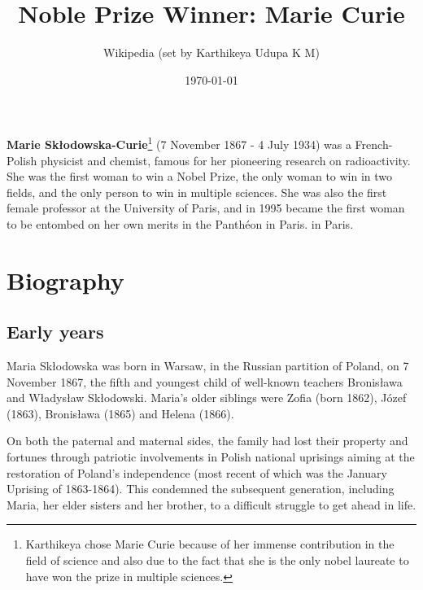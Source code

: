\documentclass[12pt,a4paper]{article}
\title{Noble Prize Winner: Marie Curie}
\author{Wikipedia (set by Karthikeya Udupa K M)}
\date{\today}
\begin{document}
 
\maketitle
\noindent
\textbf{Marie Sk\l{}odowska-Curie}\footnote{Karthikeya chose Marie Curie because of her immense contribution in the field of science and also due to the fact that she is the only nobel laureate to have won the prize in multiple sciences.} (7 November 1867 - 4 July 1934) was a French-Polish physicist and chemist, famous for her pioneering research on radioactivity. She was the first woman to win a Nobel Prize, the only woman to win in two fields, and the only person to win in multiple sciences. She was also the first female professor at the University of Paris, and in 1995 became the first woman to be entombed on her own merits in the Panth\'eon in Paris. in Paris.

\maketitle 

\section{Biography} 

\subsection{Early years}
Maria Sk\l{}odowska was born in Warsaw, in the Russian partition of Poland, on 7 November 1867, the fifth and youngest child of well-known teachers Bronis\l{}awa and W\l{}adys\l{}aw Sk\l{}odowski. Maria's older siblings were Zofia (born 1862), J\'ozef (1863), Bronis\l{}awa (1865) and Helena (1866).

On both the paternal and maternal sides, the family had lost their property and fortunes through patriotic involvements in Polish national uprisings aiming at the restoration of Poland's independence (most recent of which was the January Uprising of 1863-1864). This condemned the subsequent generation, including Maria, her elder sisters and her brother, to a difficult struggle to get ahead in life.
\end{document}
